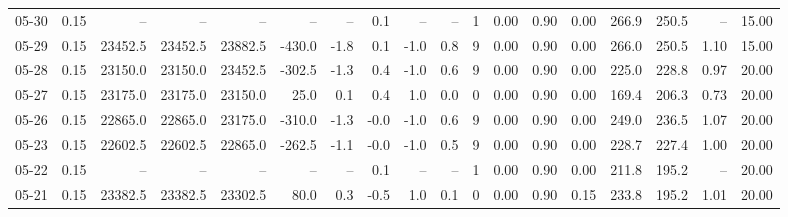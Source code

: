 \begin{threeparttable}
{\begin{tabular}{lrrrrrrrrrrrrrrrrr}
  05-30 &     0.15 &      -- &      -- &      -- &         -- &             -- &                       0.1 &                       -- &                  -- &              1 &       0.00 &      0.90 &           0.00 &            266.9 &               250.5 &              -- &                  15.00 \\
  05-29 &     0.15 & 23452.5 & 23452.5 & 23882.5 &     -430.0 &           -1.8 &                       0.1 &                     -1.0 &                 0.8 &              9 &       0.00 &      0.90 &           0.00 &            266.0 &               250.5 &            1.10 &                  15.00 \\
  05-28 &     0.15 & 23150.0 & 23150.0 & 23452.5 &     -302.5 &           -1.3 &                       0.4 &                     -1.0 &                 0.6 &              9 &       0.00 &      0.90 &           0.00 &            225.0 &               228.8 &            0.97 &                  20.00 \\
  05-27 &     0.15 & 23175.0 & 23175.0 & 23150.0 &       25.0 &            0.1 &                       0.4 &                      1.0 &                 0.0 &              0 &       0.00 &      0.90 &           0.00 &            169.4 &               206.3 &            0.73 &                  20.00 \\
  05-26 &     0.15 & 22865.0 & 22865.0 & 23175.0 &     -310.0 &           -1.3 &                      -0.0 &                     -1.0 &                 0.6 &              9 &       0.00 &      0.90 &           0.00 &            249.0 &               236.5 &            1.07 &                  20.00 \\
  05-23 &     0.15 & 22602.5 & 22602.5 & 22865.0 &     -262.5 &           -1.1 &                      -0.0 &                     -1.0 &                 0.5 &              9 &       0.00 &      0.90 &           0.00 &            228.7 &               227.4 &            1.00 &                  20.00 \\
  05-22 &     0.15 &      -- &      -- &      -- &         -- &             -- &                       0.1 &                       -- &                  -- &              1 &       0.00 &      0.90 &           0.00 &            211.8 &               195.2 &              -- &                  20.00 \\
  05-21 &     0.15 & 23382.5 & 23382.5 & 23302.5 &       80.0 &            0.3 &                      -0.5 &                      1.0 &                 0.1 &              0 &       0.00 &      0.90 &           0.15 &            233.8 &               195.2 &            1.01 &                  20.00 \\

\end{tabular}}
\end{threeparttable}

